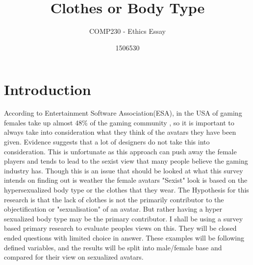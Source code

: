 \documentclass{scrartcl}
\title{Clothes or Body Type}
\subtitle{COMP230 - Ethics Essay}
\author{1506530}
\begin{document}
\maketitle

	
\newpage

\section{Introduction}

According to Entertainment Software Association(ESA), in the USA of gaming females take up almost 48\% of the gaming community \cite{SexistGames}, so it is important to always take into consideration what they think of the avatars they have been given. Evidence suggests that a lot of designers do not take this into consideration\cite{VideoGameMedia}. This is unfortunate as this approach can push away the female players and tends to lead to the sexist view that many people believe the gaming industry has. Though this is an issue that should be looked at what this survey intends on finding out is weather the female avatars "Sexist" look is based on the hypersexualized body type or the clothes that they wear.
		\newline
The Hypothesis for this research is that the lack of clothes is not the primarily contributor to the objectification or "sexualisation" of an avatar. But rather having a hyper sexualized body type may be the primary contributor. I shall be using a survey based primary research to evaluate peoples views on this. They will be closed ended questions with limited choice in answer. These examples will be following defined variables, and the results will be split into male/female base and compared for their view on sexualized avatars.
\end{document}
